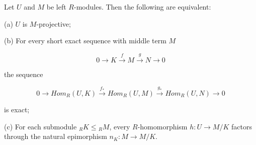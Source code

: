 Let $U$ and $M$ be left $R$-modules. Then the following are equivalent:

(a) $U$ is $M$-projective;

(b) For every short exact sequence with middle term $M$

$$0 \to K \xrightarrow{f} M \xrightarrow{g} N \to 0$$

the sequence

$$0 \to Hom_R(U, K) \xrightarrow{f_*} Hom_R(U, M) \xrightarrow{g_*} Hom_R(U, N) \to 0$$

is exact;

(c) For each submodule ${}_R K \leq {}_R M$, every $R$-homomorphism $h: U \to M/K$ factors through the natural epimorphism $n_K: M \to M/K$.
